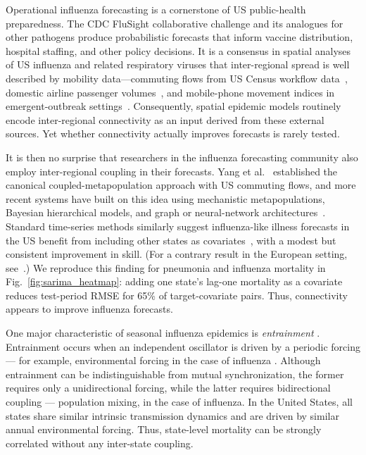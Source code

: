 \documentclass[9pt,twocolumn,twoside]{pnas-new}
\begin{document}
\maketitle
\thispagestyle{firststyle}

\Firstpage

Operational influenza forecasting is a cornerstone of US public-health
preparedness. The CDC FluSight collaborative challenge
\citep{reich2019} and its analogues for other pathogens
\citep{johansson2019} produce probabilistic forecasts that inform
vaccine distribution, hospital staffing, and other policy
decisions. It is a consensus in spatial analyses of US influenza and
related respiratory viruses that inter-regional spread is well
described by mobility data---commuting flows from US Census workflow
data~\citep{viboud2006, charu2017}, domestic airline passenger
volumes~\citep{charu2017, daon2020, zhang2026}, and mobile-phone
movement indices in emergent-outbreak
settings~\citep{kraemer2020}. Consequently, spatial epidemic models
routinely encode inter-regional connectivity as an input derived from
these external sources. Yet whether connectivity actually improves
forecasts is rarely tested.

It is then no surprise that researchers in the influenza forecasting
community also employ inter-regional coupling in their forecasts. Yang
et al.~\citep{yang2014} established the canonical
coupled-metapopulation approach with US commuting flows, and more
recent systems have built on this idea using mechanistic
metapopulations, Bayesian hierarchical models, and graph or
neural-network architectures~\citep{pei2018, osthus2021, lu2019,
  aiken2021, deng2020}. Standard time-series methods similarly suggest
influenza-like illness forecasts in the US benefit from including other
states as covariates~\citep{thivierge2025}, with a modest but
consistent improvement in skill. (For a contrary result in the
European setting, see~\citep{kramer2020}.)  We reproduce this finding
for pneumonia and influenza mortality in
Fig.~\ref{fig:sarima_heatmap}: adding one state's lag-one mortality as
a covariate reduces test-period RMSE for 65\% of target-covariate
pairs. Thus, connectivity appears to improve influenza forecasts.

One major characteristic of seasonal influenza epidemics is
\emph{entrainment} \citep{pikovsky2001}. Entrainment occurs when an
independent oscillator is driven by a periodic forcing --- for
example, environmental forcing in the case of influenza
\cite{shaman2009, shaman2010}. Although entrainment can be
indistinguishable from mutual synchronization, the former requires
only a unidirectional forcing, while the latter requires
\Endparasplit \noindent bidirectional coupling --- population mixing,
in the case of influenza. In the United States, all states share
similar intrinsic transmission dynamics and are driven by similar
annual environmental forcing. Thus, state-level mortality can be
strongly correlated without any inter-state coupling.
\end{document}
